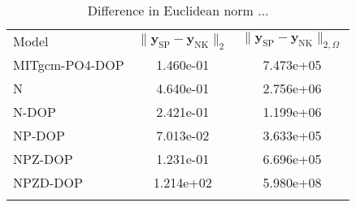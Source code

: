 
\begin{table*}
\setlength{\tabcolsep}{10pt}
\caption{\label{tab:norms}
Difference in Euclidean norm ...}
\vspace{0.3cm}
\small
\centering
\begin{tabular}{l S S}
\tophline
Model			&	{$\| \mathbf{y}_{\mathrm{SP}} - \mathbf{y}_{\mathrm{NK}} \|_2$}	& 	{$\| \mathbf{y}_{\mathrm{SP}} - \mathbf{y}_{\mathrm{NK}} \|_{2, \Omega}$}	\\
\middlehline
MITgcm-PO4-DOP  &  1.460e-01  &  7.473e+05  \\
N               &  4.640e-01  &  2.756e+06  \\
N-DOP           &  2.421e-01  &  1.199e+06  \\
NP-DOP          &  7.013e-02  &  3.633e+05  \\
NPZ-DOP         &  1.231e-01  &  6.696e+05  \\
NPZD-DOP        &  1.214e+02  &  5.980e+08  \\
\bottomhline
\end{tabular}
\end{table*}

